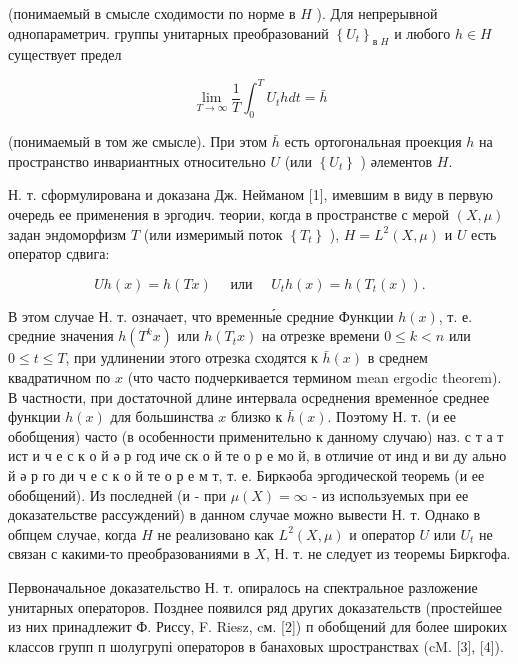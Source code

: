 \documentclass[10pt]{article}
\begin{document}
(понимаемый в смысле сходимости по норме в $H$ ). Для непрерывной однопараметрич. группы унитарных преобразований $\left\{U_{t}\right\}_{\text {в } H}$ и любого $h \in H$ существует предел



\[

\lim _{T \rightarrow \infty} \frac{1}{T} \int_{0}^{T} U_{t} h d t=\bar{h}

\]



(понимаемый в том же смысле). При этом $\bar{h}$ есть ортогональная проекция $h$ на пространство инвариантных относительно $U$ (или $\left\{U_{t}\right\}$ ) әлементов $H$.



Н. т. сформулирована и доказана Дж. Нейманом [1], имевшим в виду в первую очередь ее применения в эргодич. теории, когда в пространстве с мерой $(X, \mu)$ задан эндоморфизм $T$ (или измеримый поток $\left\{T_{t}\right\}$ ), $H=L^{2}(X, \mu)$ и $U$ есть оператор сдвига:



\[

U h(x)=h(T x) \quad \text { или } \quad U_{t} h(x)=h\left(T_{t}(x)\right) .

\]



В этом случае Н. т. означает, что временны́е средние Функции $h(x)$, т. е. средние значения $h\left(T^{k} x\right)$ или $h\left(T_{t} x\right)$ на отрезке времени $0 \leqslant k<n$ или $0 \leqslant t \leqslant T$, при удлинении этого отрезка сходятся к $\bar{h}(x)$ в среднем квадратичном по $x$ (что часто подчеркивается термином mean ergodic theorem). В частности, при достаточной длине интервала осреднения временно́е среднее функции $h(x)$ для большинства $x$ близко к $\bar{h}(x)$. Поэтому Н. т. (и ее обобщения) часто (в особенности применительно к данному случаю) наз. с т а т ист и ч е с к о й ә р год иче ск о й те о р е мо й, в отличие от инд и ви ду ально й ә р го ди ч е с к о й те о р е м т, т. е. Биркәоба эргодической теоремь (и ее обобщений). Из последней (и - при $\mu(X)=\infty$ - из используемых при ее доказательстве рассуждений) в данном случае можно вывести Н. т. Однако в обпцем случае, когда $H$ не реализовано как $L^{2}(X, \mu)$ и оператор $U$ или $U_{t}$ не связан с какими-то преобразованиями в $X$, Н. т. не следует из теоремы Биркгофа.



Первоначальное доказательство Н. т. опиралось на спектральное разложение унитарных операторов. Позднее появился ряд других доказательств (простейшее из них принадлежит Ф. Риссу, F. Riesz, cм. [2]) п обобщений для более широких классов групп п шолугрупі операторов в банаховых шространствах (cM. [3], [4]).
\end{document}
